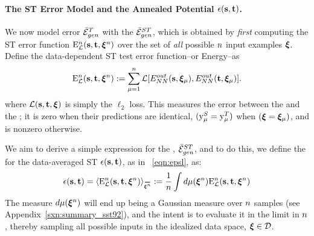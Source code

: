 \paragraph{The ST Error Model and the Annealed Potential $\epsilon({\mathbf{s}}, {\mathbf{t}} )$.}
We now model \Teacher error $\bar{\mathcal{E}}_{gen}^{T}$ with the
\emph{\AverageSTGeneralizationError} $\bar{\mathcal{E}}^{ST}_{gen}$, which is obtained
 by \emph{first} computing the ST error function
${\mathrm{E}}^{n}_{\mathcal{L}}({\mathbf{s}},{\mathbf{t}},\boldsymbol{\xi}^{n})$
over the set of \emph{all} possible $n$ input examples $\boldsymbol{\xi}$.  Define the data-dependent ST test error function--or Energy--as 
\begin{align}
\label{eqn:DE_L}
{\mathrm{E}}^{n}_{\mathcal{L}}({\mathbf{s}},{\mathbf{t}},\boldsymbol{\xi}^{n}):=\sum_{\mu=1}^{n}\mathcal{L}[E^{out}_{NN}({\mathbf{s}},\boldsymbol{\xi}_{\mu}),E^{out}_{NN}({\mathbf{t}},\boldsymbol{\xi}_{\mu})]  .
\end{align}
where $\mathcal{L}({\mathbf{s}},{\mathbf{t}}, \boldsymbol{\xi})$ is simply the $\ell_2$ loss.  This measures the error
between the \Student and the \Teacher; it is zero when their predictions are identical,
$(\mathrm{y}_{\mu}^{S}=\mathrm{y}_{\mu}^{T})$ when $(\boldsymbol{\xi}=\boldsymbol{\xi}_{\mu})$, and is nonzero otherwise.

We aim to derive a simple expression for the  \AverageSTGeneralizationError, $\bar{\mathcal{E}}^{ST}_{gen}$, and to do this, 
we define the  \EffectivePotential for the data-averaged ST \GeneralizationError $\epsilon({\mathbf{s}},{\mathbf{t}})$, as in \EQN~\ref{eqn:epsl}, as:
\begin{align}
\label{eqn:STerror}
\EPSLSTx = \langle\DETOPSTL\rangle_{\AVGNDXI}:=\frac{1}{\ND}\int d\mu(\NDXI)\DETOPSTL
\end{align}
The measure $d\mu(\boldsymbol{\xi}^{n})$ will end up being a Gaussian measure over $n$ samples
(see Appendix~\ref{sxn:summary_sst92}), and the intent is to evaluate it
in the \LargeN limit in $n$, thereby sampling all possible inputs in the idealized data space, $\boldsymbol{\xi}\in\mathcal{D}$.

